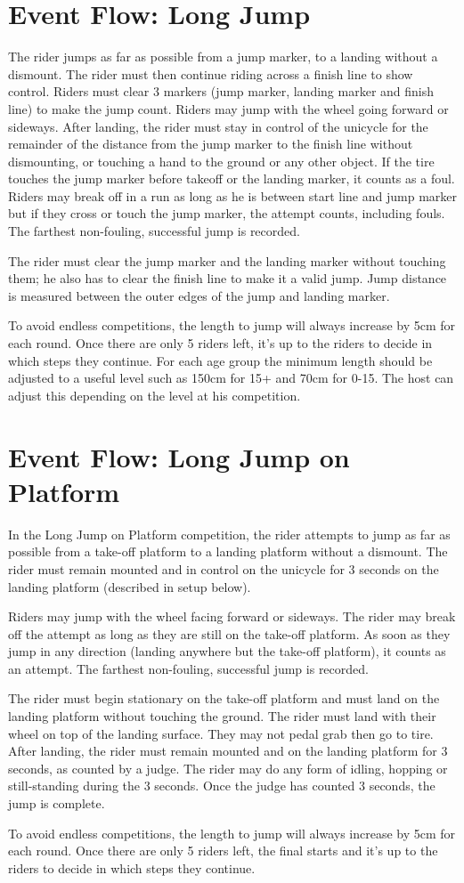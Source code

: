 \section{Event Flow: Long Jump}
The rider jumps as far as possible from a jump marker, to a landing without a dismount.
The rider must then continue riding across a finish line to show control.
Riders must clear 3 markers (jump marker, landing marker and finish line) to make the jump count.
Riders may jump with the wheel going forward or sideways.
After landing, the rider must stay in control of the unicycle for the remainder of the distance from the jump marker to the finish line without dismounting, or touching a hand to the ground or any other object.
If the tire touches the jump marker before takeoff or the landing marker, it counts as a foul.
Riders may break off in a run as long as he is between start line and jump marker but if they cross or touch the jump marker, the attempt counts, including fouls.
The farthest non-fouling, successful jump is recorded.

The rider must clear the jump marker and the landing marker without touching them; he also has to clear the finish line to make it a valid jump.
Jump distance is measured between the outer edges of the jump and landing marker.

To avoid endless competitions, the length to jump will always increase by 5cm for each round.
Once there are only 5 riders left, it's up to the riders to decide in which steps they continue.
For each age group the minimum length should be adjusted to a useful level such as 150cm for 15+ and 70cm for 0-15.
The host can adjust this depending on the level at his competition.

\section{Event Flow: Long Jump on Platform}
In the Long Jump on Platform competition, the rider attempts to jump as far as possible from a take-off platform to a landing platform without a dismount.
The rider must remain mounted and in control on the unicycle for 3 seconds on the landing platform (described in setup below).

Riders may jump with the wheel facing forward or sideways.
The rider may break off the attempt as long as they are still on the take-off platform.
As soon as they jump in any direction (landing anywhere but the take-off platform), it counts as an attempt.
The farthest non-fouling, successful jump is recorded.

The rider must begin stationary on the take-off platform and must land on the landing platform without touching the ground.
The rider must land with their wheel on top of the landing surface.
They may not pedal grab then go to tire.
After landing, the rider must remain mounted and on the landing platform for 3 seconds, as counted by a judge.
The rider may do any form of idling, hopping or still-standing during the 3 seconds.
Once the judge has counted 3 seconds, the jump is complete.

To avoid endless competitions, the length to jump will always increase by 5cm for each round.
Once there are only 5 riders left, the final starts and it's up to the riders to decide in which steps they continue.
